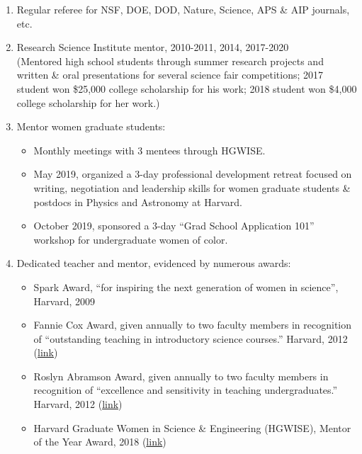 \begin{enumerate}

\item Regular referee for NSF, DOE, DOD, Nature, Science, APS \& AIP journals, etc.

\item Research Science Institute mentor, 2010-2011, 2014, 2017-2020 \\
    (Mentored high school students through summer research projects and written \& oral presentations for several science fair competitions; 2017 student won \$25,000 college scholarship for his work; 2018 student won \$4,000 college scholarship for her work.)

\item Mentor women graduate students:
\begin{itemize}
    \item Monthly meetings with 3 mentees through HGWISE.
    \item May 2019, organized a 3-day professional development retreat focused on writing, negotiation and leadership skills for women graduate students \& postdocs in Physics and Astronomy at Harvard.
    \item October 2019, sponsored a 3-day ``Grad School Application 101'' workshop for undergraduate women of color.
\end{itemize}

\item Dedicated teacher and mentor, evidenced by numerous awards:
\begin{itemize}
    \item Spark Award, ``for inspiring the next generation of women in science'', Harvard, 2009
    \item Fannie Cox Award, given annually to two faculty members in recognition of
``outstanding teaching in introductory science courses.'' Harvard, 2012 (\href{https://news.harvard.edu/gazette/story/2012/10/two-professors-win-fannie-cox-prize/}{link})
    \item Roslyn Abramson Award, given annually to two faculty members in recognition of
``excellence and sensitivity in teaching undergraduates.'' Harvard, 2012 (\href{https://news.harvard.edu/gazette/story/2012/05/hoffman-beerbohm-win-teaching-prize/}{link})
    \item Harvard Graduate Women in Science \& Engineering (HGWISE), Mentor of the Year Award, 2018 (\href{https://gsas.harvard.edu/news/stories/lean-lean-hgwise-mentor-year-award}{link})
\end{itemize}


\end{enumerate}
